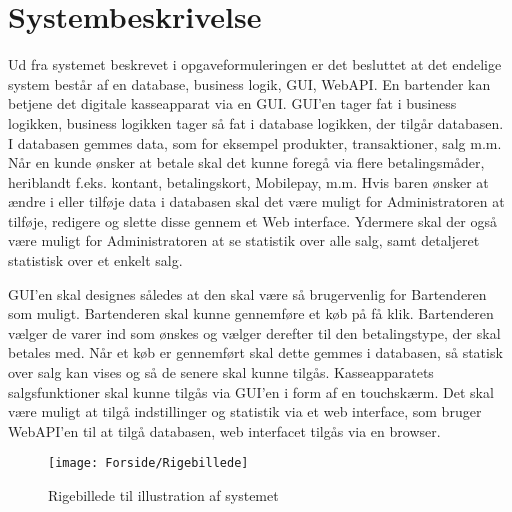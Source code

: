 \chapter{Systembeskrivelse}

Ud fra systemet beskrevet i opgaveformuleringen er det besluttet at det endelige system består af en database, business logik, \gls{GUI}, \gls{WebAPI}. 
\newline
\newline
En bartender kan betjene det digitale kasseapparat via en \gls{GUI}. \gls{GUI}'en tager fat i business logikken, business logikken tager så fat i database logikken, der tilgår databasen. I databasen gemmes data, som for eksempel produkter, transaktioner, salg m.m.
Når en kunde ønsker at betale skal det kunne foregå via flere betalingsmåder, heriblandt f.eks. kontant, betalingskort, Mobilepay, m.m.
\newline
\newline
Hvis baren ønsker at ændre i eller tilføje data i databasen skal det være muligt for Administratoren at tilføje, redigere og slette disse gennem et Web interface. Ydermere skal der også være muligt for Administratoren at se statistik over alle salg, samt detaljeret statistisk over et enkelt salg. 

\newline
\newline
GUI'en skal designes således at den skal være så brugervenlig for Bartenderen som muligt. Bartenderen skal kunne gennemføre et køb på få klik. Bartenderen vælger de varer ind som ønskes og vælger derefter til den betalingstype, der skal betales med. Når et køb er gennemført skal dette gemmes i databasen, så statisk over salg kan vises og så de senere skal kunne tilgås. 
\newline
\newline
Kasseapparatets salgsfunktioner skal kunne tilgås via \gls{GUI}'en i form af en touchskærm. Det skal være muligt at tilgå indstillinger og statistik via et web interface, som bruger \gls{WebAPI}'en til at tilgå databasen, web interfacet tilgås via en browser. 
                  
\begin{figure}[h]
    \centering
    \texttt{[image: Forside/Rigebillede]}
    \caption{Rigebillede til illustration af systemet}
    \label{fig:rig_billede}
\end{figure} 

